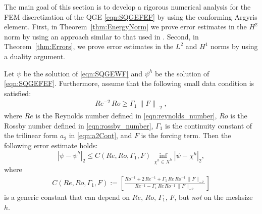 The main goal of this section is to develop a rigorous numerical analysis for the FEM discretization
of the QGE \eqref{eqn:SQGEFEF} by using the conforming Argyris element.  First, in
Theorem~\ref{thm:EnergyNorm} we prove error estimates in the $H^2$ norm by using an approach similar
to that used in \cite{Cayco86}.  Second, in Theorem~\ref{thm:Errors}, we prove error estimates in
the $L^2$ and $H^1$ norms by using a duality argument.

\begin{theorem}
\label{thm:EnergyNorm}
  Let $\psi$ be the solution of \eqref{eqn:SQGEWF} and $\psi^h$ be the solution
  of \eqref{eqn:SQGEFEF}. 
  Furthermore, assume that the following small data condition is satisfied:
  \begin{eqnarray}
  Re^{-2} \, Ro 
  \geq \Gamma_1 \, \| F \|_{-2} ,
  \label{eqn:small_data_condition}
  \end{eqnarray}
where 
$Re$ is the Reynolds number defined in \eqref{eqn:reynolds_number}, 
$Ro$  is the Rossby number defined in \eqref{eqn:rossby_number},
 $\Gamma_1$ is the continuity constant of the trilinear form $a_2$ in \eqref{eqn:a2Cont}, and 
 $F$ is the forcing term.
Then the following error estimate holds:
  \begin{equation}
    |\psi - \psi^h|_2 
    \le C(Re, Ro, \Gamma_1, F) \, \inf_{\chi^h \in X^h} |\psi - \chi^h|_2 ,
    \label{eqn:EnergyNorm}
  \end{equation}
  where
  \begin{eqnarray} 
  C(Re, Ro, \Gamma_1, F)
  := \left[
  \frac{
  Ro^{-1}
  + 2 \, Re^{-1} 
  + \Gamma_1 \, Re \, Ro^{-1} \, \| F \|_{-2}
  }
  {
  Re^{-1}
  - \Gamma_1 \, Re \, Ro^{-1} \, \| F \|_{-2}
  }
  \right]
  \label{eqn:constant_definition}
  \end{eqnarray}
is a generic constant that can depend on $Re$, $Ro$, $\Gamma_1$, $F$, but \emph{not} on the meshsize $h$.    
\end{theorem}

